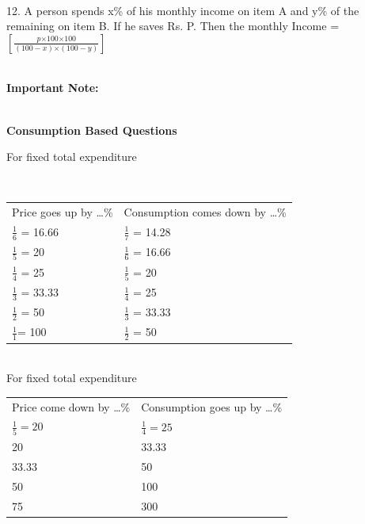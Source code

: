 \documentclass{article}
\begin{document}
\noindent 

\noindent \\ 12. A person spends x\% of his monthly income on item A and y\% of the remaining on item B. If he saves Rs. P. Then the monthly Income = $ [\frac{p \mathrm{\times} 100 \mathrm{\times} 100 }{(100 - x) \mathrm{\times} (100 - y)}] $



\noindent \\ \textbf{Important Note:}

\noindent 

\noindent \\ \textbf{Consumption Based Questions}

\noindent 

\noindent For fixed total expenditure

\noindent \\ 

\begin{tabular}{p{2.0in} p{2.0in}}  
	Price goes up by {\dots}\%  &  Consumption comes down by {\dots}\% \\ 
	$ \frac{1}{6} $ = 16.66     & $ \frac{1}{7} $ = 14.28 \\ 
	$ \frac{1}{5} $ = 20        & $ \frac{1}{6} $ = 16.66 \\ 
	$ \frac{1}{4} $ = 25        & $ \frac{1}{5} $ = 20 \\ 
	$ \frac{1}{3} $ = 33.33     & $ \frac{1}{4} $ = 25 \\ 
	$ \frac{1}{2} $ = 50        & $ \frac{1}{3} $ = 33.33 \\ 
    $ \frac{1}{1} $= 100        & $ \frac{1}{2} $ = 50 \\ 
\end{tabular}



\noindent \\  For fixed total expenditure

\begin{tabular}{p{2.0in} p{2.0in}}  
	Price come down  by {\dots}\%  &  Consumption goes up by {\dots}\% \\ 
	$ \frac{1}{5}  = 20$     & $ \frac{1}{4} = 25$ \\ 
	20        & 33.33 \\ 
	33.33        & 50 \\ 
	50     & 100 \\ 
	75        & 300 \\ 
	
\end{tabular}
\end{document}
